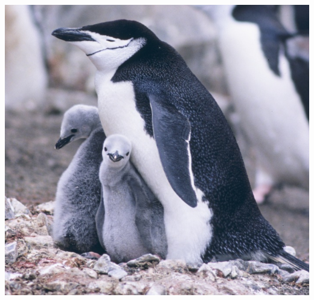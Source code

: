 \begin{minipage}[t]{170mm}
\begin{center}
\includegraphics[width=\linewidth]{pingvin.jpg}
\end{center}
\end{minipage}
